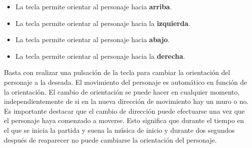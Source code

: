 \documentclass[11pt,a4paper]{article}
\begin{document}
\begin{itemize}
	\item La tecla  permite orientar al personaje hacia \textbf{arriba}.
	\item La tecla  permite orientar al personaje hacia la \textbf{izquierda}.
	\item La tecla  permite orientar al personaje hacia \textbf{abajo}.
	\item La tecla  permite orientar al personaje hacia la \textbf{derecha}.
\end{itemize}

Basta con realizar una pulsación de la tecla para cambiar la orientación del personaje a la
deseada. El movimiento del personaje es automático en función de la orientación. El cambio
de orientación se puede hacer en cualquier momento, independientemente de si en la nueva
dirección de movimiento hay un muro o no.
Es importante destacar que el cambio de dirección puede efectuarse una vez que el personaje
haya comenzado a moverse. Esto significa que durante el tiempo en el que se inicia la partida y
suena la música de inicio y durante dos segundos después de reaparecer no puede cambiarse la
orientación del personaje.
\end{document}
